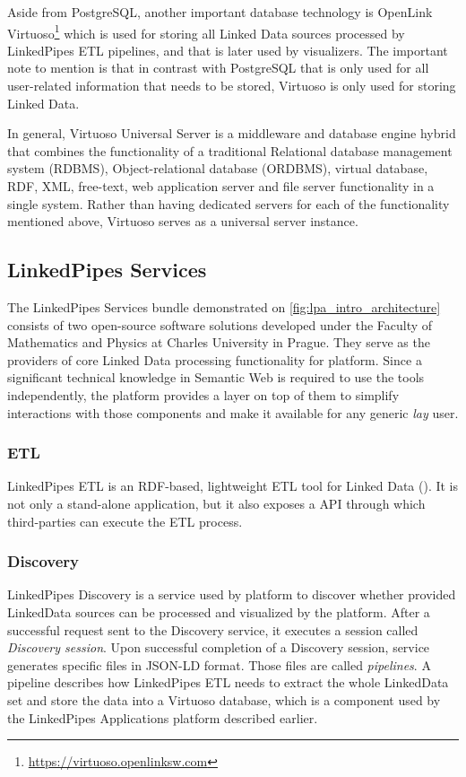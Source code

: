 Aside from PostgreSQL, another important database technology is OpenLink Virtuoso\footnote{\url{https://virtuoso.openlinksw.com}} which is used for storing all Linked Data sources processed by LinkedPipes ETL pipelines, and that is later used by \lpa{} visualizers. The important note to mention is that in contrast with PostgreSQL that is only used for all user-related information that needs to be stored, Virtuoso is only used for storing Linked Data. 

In general, Virtuoso Universal Server is a middleware and database engine hybrid that combines the functionality of a traditional Relational database management system (RDBMS), Object-relational database (ORDBMS), virtual database, RDF, XML, free-text, web application server and file server functionality in a single system. Rather than having dedicated servers for each of the functionality mentioned above, Virtuoso serves as a universal server instance.

\subsection{LinkedPipes Services} 
\label{ssssec:linkedpipes_services}

The LinkedPipes Services bundle demonstrated on \autoref{fig:lpa_intro_architecture} consists of two open-source software solutions developed under the Faculty of Mathematics and Physics at Charles University in Prague. They serve as the providers of core Linked Data processing functionality for \lpa{} platform. Since a significant technical knowledge in Semantic Web is required to use the tools independently, the \lpa{} platform provides a layer on top of them to simplify interactions with those components and make it available for any generic \textit{lay} user. 

\subsubsection{ETL} 

LinkedPipes ETL is an RDF-based, lightweight \gls{ETL} tool for Linked Data (\cite{klimek2016linkedpipes_etl}). It is not only a stand-alone application, but it also exposes a \acrshort{API} through which third-parties can execute the ETL process. 

\subsubsection{Discovery} 

LinkedPipes Discovery is a service used by \lpa{} platform to discover whether provided LinkedData sources can be processed and visualized by the platform. After a successful request sent to the Discovery service, it executes a session called \textit{Discovery session}. Upon successful completion of a Discovery session, service generates specific files in JSON-LD format. Those files are called \textit{pipelines}. A pipeline describes how LinkedPipes ETL needs to extract the whole LinkedData set and store the data into a Virtuoso database, which is a component used by the LinkedPipes Applications platform described earlier. 
